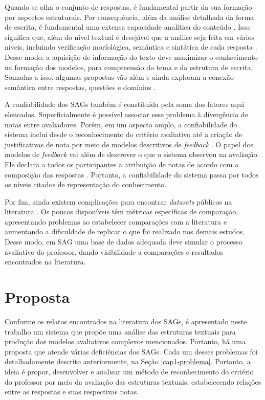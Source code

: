 Quando se olha o conjunto de respostas, é fundamental partir da sua formação por aspectos estruturais. Por consequência, além da análise detalhada da forma de escrita, é fundamental uma extensa capacidade analítica do conteúdo \cite{saha2018}. Isso significa que, além do nível textual é desejável que a análise seja feita em vários níveis, incluindo verificação morfológica, semântica e sintática de cada resposta \cite{sakaguchi2015, riordan2019, sahu2020}. Desse modo, a aquisição de informação do texto deve maximizar o conhecimento na formação dos modelos, para compreensão do tema e da estrutura de escrita. Somadas a isso, algumas propostas vão além e ainda exploram a conexão semântica entre respostas, questões e domínios \cite{dzikovska2013, saha2019}.

A confiabilidade dos SAGs também é constituída pela soma dos fatores aqui elencados. Superficialmente é possível associar esse problema à divergência de notas entre avaliadores. Porém, em um aspecto amplo, a confiabilidade do sistema inclui desde o reconhecimento do critério avaliativo até a criação de justificativas de nota por meio de modelos descritivos de \textit{feedback} \cite{kumar2019}. O papel dos modelos de \textit{feedback} vai além de descrever o que o sistema observou na avaliação. Ele declara a todos os participantes a atribuição de notas de acordo com a composição das respostas \cite{marvaniya2018, bernius2022}. Portanto, a confiabilidade do sistema passa por todos os níveis citados de representação do conhecimento.

Por fim, ainda existem complicações para encontrar \textit{datasets} públicos na literatura \cite{burrows2015}. Os poucos disponíveis têm métricas específicas de comparação, apresentando problemas ao estabelecer comparações com a literatura e aumentando a dificuldade de replicar o que foi realizado nos demais estudos. Desse modo, em SAG uma base de dados adequada deve simular o processo avaliativo do professor, dando visibilidade a comparações e resultados encontrados na literatura.


\section{Proposta}
\label{cap1-proposta}

Conforme os relatos encontrados na literatura dos SAGs, é apresentado neste trabalho um sistema que propõe uma análise das estruturas textuais para produção dos modelos avaliativos complexos mencionados. Portanto, há uma proposta que atende várias deficiências dos SAGs. Cada um desses problemas foi detalhadamente descrito anteriormente, na Seção \ref{cap1-problema}. Portanto, a ideia é propor, desenvolver e analisar um método de reconhecimento do critério do professor por meio da avaliação das estruturas textuais, estabelecendo relações entre as respostas e suas respectivas notas.

